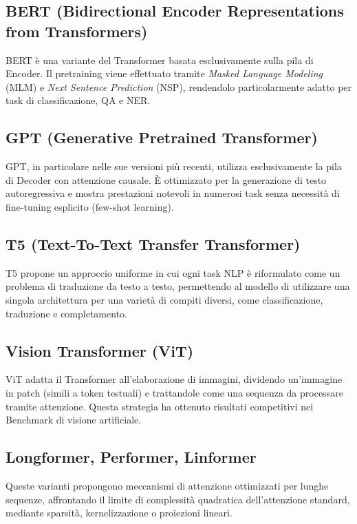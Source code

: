 \subsection{BERT (Bidirectional Encoder Representations from Transformers)}
BERT è una variante del Transformer basata esclusivamente sulla pila di Encoder. Il pretraining viene effettuato tramite \textit{Masked Language Modeling} (MLM) e \textit{Next Sentence Prediction} (NSP), rendendolo particolarmente adatto per task di classificazione, QA e NER.

\subsection{GPT (Generative Pretrained Transformer)}
GPT, in particolare nelle sue versioni più recenti, utilizza esclusivamente la pila di Decoder con attenzione causale. È ottimizzato per la generazione di testo autoregressiva e mostra prestazioni notevoli in numerosi task senza necessità di fine-tuning esplicito (few-shot learning).

\subsection{T5 (Text-To-Text Transfer Transformer)}
T5 propone un approccio uniforme in cui ogni task NLP è riformulato come un problema di traduzione da testo a testo, permettendo al modello di utilizzare una singola architettura per una varietà di compiti diversi, come classificazione, traduzione e completamento.

\subsection{Vision Transformer (ViT)}
ViT adatta il Transformer all’elaborazione di immagini, dividendo un’immagine in patch (simili a token testuali) e trattandole come una sequenza da processare tramite attenzione. Questa strategia ha ottenuto risultati competitivi nei Benchmark di visione artificiale.

\subsection{Longformer, Performer, Linformer}
Queste varianti propongono meccanismi di attenzione ottimizzati per lunghe sequenze, affrontando il limite di complessità quadratica dell’attenzione standard, mediante sparsità, kernelizzazione o proiezioni lineari.

